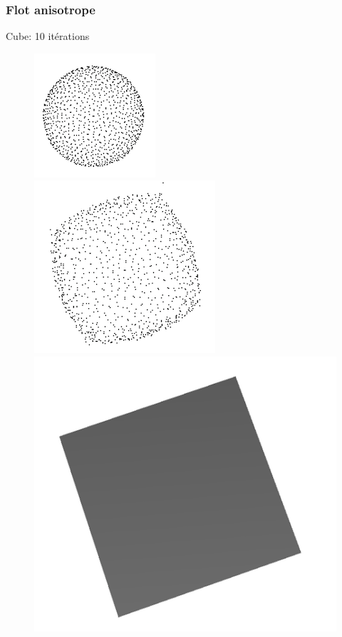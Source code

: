 \documentclass{beamer}
\begin{document}
\begin{frame}[allowframebreaks]
    \frametitle{Flot anisotrope}

    Cube: 10 itérations
    \begin{figure}
        \centering
        \includegraphics[scale=0.4]{img/sphere-cube-0}
        \includegraphics[scale=0.3]{img/sphere-cube-10}
        \includegraphics[scale=0.2]{img/sphere-cube-cube}
    \end{figure}


\end{frame}
\end{document}
